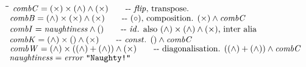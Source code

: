 \documentclass{article}
\newlength{\lwidth}\setlength{\lwidth}{4.5cm}
\newlength{\cwidth}\setlength{\cwidth}{8mm} %
\newcommand{\Varid}[1]{\mathit{#1}}
\begin{document}
\begin{tabbing}
\qquad\=\hspace{\lwidth}\=\hspace{\cwidth}\=\+\kill
${\Varid{combC}\mathrel{=}(\times)\times(\wedge)\wedge(\times)\mbox{\qquad-{}-  \ensuremath{\Varid{flip}}, transpose. }}$\\
${\Varid{combB}\mathrel{=}(\wedge)\times(\times)\wedge(\times)\mbox{\qquad-{}-  \ensuremath{(\mathbin{\circ})}, composition. \ensuremath{(\times)\wedge\Varid{combC}} }}$\\
${\Varid{combI}\mathrel{=}\Varid{naughtiness}\wedge(\!\mathop{{}^{{}^{\cdot}}}\!)\mbox{\qquad-{}-  \ensuremath{\Varid{id}}. also \ensuremath{(\wedge)\times(\wedge)\wedge(\times)}, inter alia}}$\\
${\Varid{combK}\mathrel{=}(\wedge)\times(\!\mathop{{}^{{}^{\cdot}}}\!)\wedge(\times)\mbox{\qquad-{}-  \ensuremath{\Varid{const}}. \ensuremath{(\!\mathop{{}^{{}^{\cdot}}}\!)\wedge\Varid{combC}}}}$\\
${\Varid{combW}\mathrel{=}(\wedge)\times((\wedge)\mathbin{+}(\wedge))\wedge(\times)\mbox{\qquad-{}-  diagonalisation. \ensuremath{((\wedge)\mathbin{+}(\wedge))\wedge\Varid{combC}}}}$\\
${\Varid{naughtiness}\mathrel{=}\Varid{error}\;\text{\ttfamily \char34 Naughty!\char34}}$
\end{tabbing}
\end{document}
